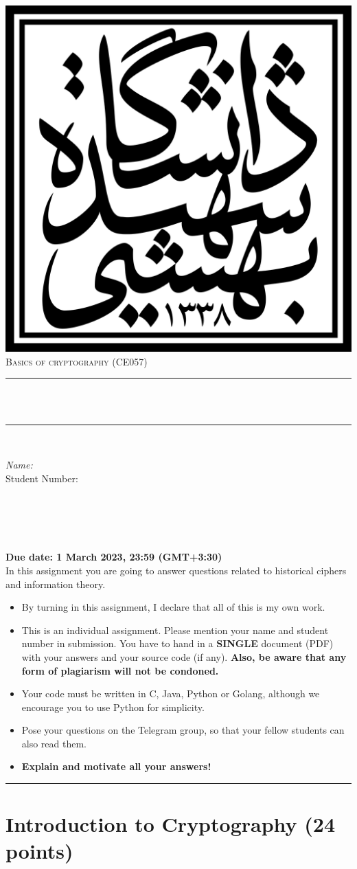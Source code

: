 \documentclass[12pt,oneside,oldfontcommands]{memoir}
\makeatletter
\def\maketitle{%
  \null
  \thispagestyle{empty}
  \begin{center}\leavevmode
       \normalfont
       \includegraphics[width=0.3\columnwidth]{figures/Sbu-logo.svg.png}
       \vskip 0.5cm   
       \textsc{\Large Basics of cryptography (CE057)}\\[0.5 cm]
	     {\large \@date\par}
       \vskip 1.0cm
	\rule{\linewidth}{0.2 mm} \\[0.4 cm]
	{ \huge \bfseries \@title}\\
	\rule{\linewidth}{0.2 mm} \\[1.5 cm]
	
	\begin{minipage}{0.5\textwidth}
		\begin{flushleft} \large
			\emph{Name:} \studentone\\
			Student Number: \studentonenumber
			\end{flushleft}
			\end{minipage}~
			\begin{minipage}{0.4\textwidth}
			\begin{flushleft} \large
		\end{flushleft}
	\end{minipage}\\[2 cm]
   \end{center}
   \vfill
   \null
   \cleardoublepage
  }
\makeatother
\begin{document}
  \maketitle
  \begin{center}

  \vspace{-0.3in}
  \begin{tabular}{rl}
  \end{tabular}
  \end{center}
    \textbf{Due date: 1 March 2023, 23:59 (GMT+3:30)}\\
    In this assignment you are going to answer questions related to historical ciphers
    and information theory.
    \begin{itemize}
        \item By turning in this assignment, I declare that all of this is my own work.
        \item This is an individual assignment. Please mention your name and student number in
        submission. You have to hand in a  \textbf{SINGLE} document (PDF) with your answers
        and your source code (if any).\textbf{ Also, be aware that any form of plagiarism
        will not be condoned.}
        \item Your code must be written in C, Java, Python or Golang, although we encourage you to use Python for simplicity.
        \item Pose your questions on the Telegram group, so that your fellow students can also
        read them.
        \item \textbf{Explain and motivate all your answers!}
    \end{itemize}

  \noindent
  \rule{\linewidth}{0.4pt}
  \section*{Introduction to Cryptography (24 points)}
\end{document}
